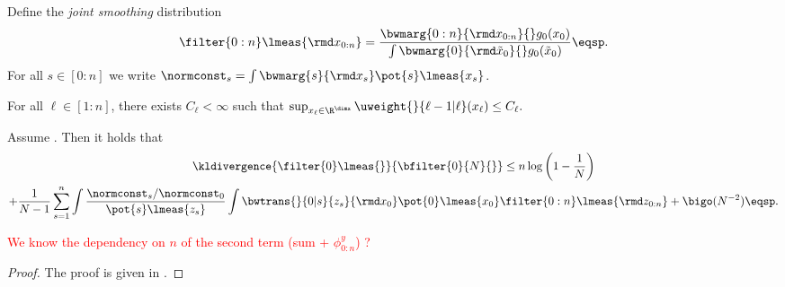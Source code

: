Define the \emph{joint smoothing} distribution 
\begin{equation} 
    \filter{0:n}\lmeas{\rmd x_{0:n}} = \frac{\bwmarg{0:n}{\rmd x_{0:n}}{}  g_0(x_0)}{\int \bwmarg{0}{\rmd \tilde{x}_{0}}{}  g_0(\tilde{x}_0)} \eqsp.
\end{equation}
For all $s \in [0:n]$ we write $\normconst_s = \int \bwmarg{s}{\rmd x_s} \pot{s}\lmeas{x_s}$.
\begin{hypA} 
    \label{assp:bounded_weights}
    For all $\ell \in [1:n]$, there exists $C_\ell < \infty$ such that $\sup_{x_\ell \in \R^{\dimx}} \uweight{}{\ell-1|\ell}(x_\ell) \leq C_\ell.$
\end{hypA}

\begin{proposition} \label{lem:kldiv:filtering}
    Assume \assp{\ref{assp:bounded_weights}}. Then it holds that
    \begin{multline*}
        \kldivergence{\filter{0}\lmeas{}}{\bfilter{0}{N}{}} \leq n \log \left(1-\frac{1}{N}\right) \\
         + \frac{1}{N-1}  \sum_{s = 1}^n \int \frac{\normconst_s / \normconst_0}{\pot{s}\lmeas{z_s}} \int \bwtrans{}{0|s}{z_s}{\rmd x_0} \pot{0}\lmeas{x_0} \filter{0:n}\lmeas{\rmd z_{0:n}} + \bigo(N^{-2}) \eqsp.
    \end{multline*}
\end{proposition}
\textcolor{red}{We know the dependency on $n$ of the second term (sum + $\phi_{0:n}^y$) ? }
\begin{proof}  
    The proof is given in .
\end{proof}

